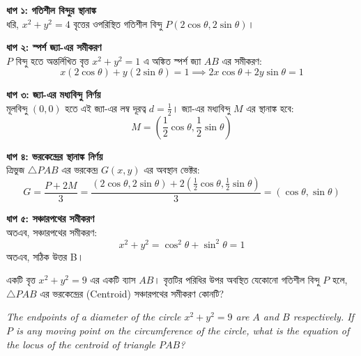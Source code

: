 \documentclass[12pt, a4paper]{article}
\begin{document}
\begin{tcolorbox}[solutionbox={সমাধান (Solution)}]
    \noindent
    \textbf{ধাপ ১: গতিশীল বিন্দুর স্থানাঙ্ক} \\
    ধরি, $x^2 + y^2 = 4$ বৃত্তের ওপরিস্থিত গতিশীল বিন্দু $P(2\cos\theta, 2\sin\theta)$।
    
    \vspace{0.5em}
    \noindent\textbf{ধাপ ২: স্পর্শ জ্যা-এর সমীকরণ} \\
    $P$ বিন্দু হতে অন্তর্লিখিত বৃত্ত $x^2 + y^2 = 1$ এ অঙ্কিত স্পর্শ জ্যা $AB$ এর সমীকরণ:
    \[ x(2\cos\theta) + y(2\sin\theta) = 1 \implies 2x\cos\theta + 2y\sin\theta = 1 \]
    
    \vspace{0.5em}
    \noindent\textbf{ধাপ ৩: জ্যা-এর মধ্যবিন্দু নির্ণয়} \\
    মূলবিন্দু $(0,0)$ হতে এই জ্যা-এর লম্ব দূরত্ব $d = \frac{1}{2}$। জ্যা-এর মধ্যবিন্দু $M$ এর স্থানাঙ্ক হবে:
    \[ M = \left(\frac{1}{2}\cos\theta, \frac{1}{2}\sin\theta\right) \]
    
    \vspace{0.5em}
    \noindent\textbf{ধাপ ৪: ভরকেন্দ্রের স্থানাঙ্ক নির্ণয়} \\
    ত্রিভুজ $\triangle PAB$ এর ভরকেন্দ্র $G(x, y)$ এর অবস্থান ভেক্টর:
    \[ G = \frac{P + 2M}{3} = \frac{(2\cos\theta, 2\sin\theta) + 2\left(\frac{1}{2}\cos\theta, \frac{1}{2}\sin\theta\right)}{3} = (\cos\theta, \sin\theta) \]
    
    \vspace{0.5em}
    \noindent\textbf{ধাপ ৫: সঞ্চারপথের সমীকরণ} \\
    অতএব, সঞ্চারপথের সমীকরণ:
    \[ x^2 + y^2 = \cos^2\theta + \sin^2\theta = 1 \]
    অতএব, সঠিক উত্তর B।
\end{tcolorbox}

\begin{tcolorbox}[questionbox={প্রশ্ন (Question) 29}]
    \noindent
    একটি বৃত্ত $x^2 + y^2 = 9$ এর একটি ব্যাস $AB$। বৃত্তটির পরিধির উপর অবস্থিত যেকোনো গতিশীল বিন্দু $P$ হলে, $\triangle PAB$ এর ভরকেন্দ্রের (Centroid) সঞ্চারপথের সমীকরণ কোনটি?
    
    \vspace{0.8em}
    \begin{english}
    \noindent\textit{\color{darkgray}
    The endpoints of a diameter of the circle $x^2 + y^2 = 9$ are $A$ and $B$ respectively. If $P$ is any moving point on the circumference of the circle, what is the equation of the locus of the centroid of triangle $PAB$?
    }
    \end{english}
\end{tcolorbox}
\end{document}
